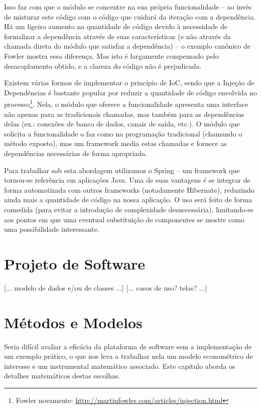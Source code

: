 \documentclass{abnt}
\begin{document}
Isso faz com que o módulo se concentre na sua própria funcionalidade – ao invés de misturar este código com o código que cuidará da iteração com a dependência. Há um ligeiro aumento na quantidade de código devido à necessidade de formalizar a dependência através de suas características (e não através da chamada direta do módulo que satisfaz a dependência) – o exemplo canônico de Fowler mostra essa diferença. Mas isto é largamente compensado pelo desacoplamento obtido, e a clareza do código não é prejudicada.

Existem várias formas de implementar o princípio de IoC, sendo que a Injeção de Dependências é bastante popular por reduzir a quantidade de código envolvida no processo\footnote{Fowler novamente: \url{http://martinfowler.com/articles/injection.html}}. Nela, o módulo que oferece a funcionalidade apresenta uma interface não apenas para as tradicionais chamadas, mas também para as dependências delas (ex.: conexões de banco de dados, canais de saída, etc.). O módulo que solicita a funcionalidade o faz como na programação tradicional (chamando o método exposto), mas um framework media estas chamadas e fornece as dependências necessárias de forma apropriada.

Para trabalhar sob esta abordagem utilizamos o Spring – um framework que tornou-se referência em aplicações Java. Uma de suas vantagens é se integrar de forma automatizada com outros frameworks (notadamente Hibernate), reduzindo ainda mais a quantidade de código na nossa aplicação. O uso será feito de forma comedida (para evitar a introdução de complexidade desnecessária), limitando-se aos pontos em que uma eventual substituição de componentes se mostre como uma possibilidade interessante.

\chapter {Projeto de Software}


[... modelo de dados e/ou de classes ...]
[... casos de uso? telas? ...]

\chapter {Métodos e Modelos}

Seria difícil avaliar a eficácia da plataforma de software sem a implementação de um exemplo prático, o que nos leva a trabalhar nela um modelo econométrico de interesse e um instrumental matemático associado. Este capítulo aborda os detalhes matemáticos destas escolhas.
\end{document}

